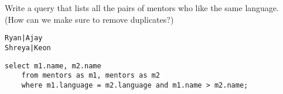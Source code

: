 \begin{blocksection}
\question Write a query that lists all the pairs of mentors who like the same language. (How can we make sure to remove duplicates?)

\begin{lstlisting}
Ryan|Ajay
Shreya|Keon
\end{lstlisting}

\begin{solution}[1in]
\begin{lstlisting}
select m1.name, m2.name
    from mentors as m1, mentors as m2
    where m1.language = m2.language and m1.name > m2.name;
\end{lstlisting}
\end{solution}
\end{blocksection}
